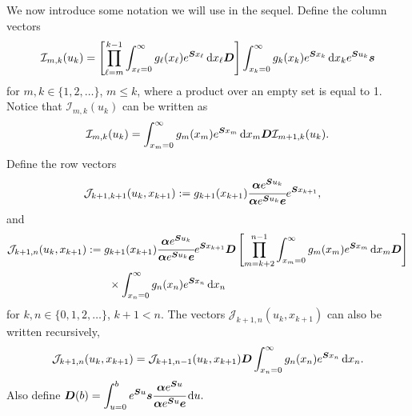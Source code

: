 We now introduce some notation we will use in the sequel. Define the column vectors 
\begin{align}
	\mathcal I_{m,k}(u_k) = \left[\prod_{\ell=m}^{k-1}\int_{x_\ell=0}^\infty g_\ell(x_\ell) e^{\boldsymbol{S}x_\ell}\, \mathrm{d} x_\ell \boldsymbol{D} \right]
            	\int_{x_k=0}^\infty g_{k}(x_k) e^{\boldsymbol{S}x_k} \, \mathrm{d} x_k e^{\boldsymbol{S}u_k}\boldsymbol s
\end{align}
for \(m,k\in\{1,2,\dots\}\), \(m\leq k\), where a product over an empty set is equal to 1. Notice that \(\mathcal I_{m,k}(u_k)\) can be written as 
\begin{align}
	\mathcal I_{m,k}(u_k) = \int_{x_m=0}^\infty g_m(x_m)e^{\boldsymbol Sx_m} \, \mathrm{d} x_m \boldsymbol D \mathcal I_{m+1,k}(u_k). \label{eqn: I recursive} 
\end{align}
Define the row vectors 
\begin{align}
	\mathcal J_{k+1,k+1}(u_k,x_{k+1}) &:= g_{k+1}(x_{k+1})\cfrac{\boldsymbol \alpha e^{\boldsymbol{S}u_{k}}}{\boldsymbol \alpha e^{\boldsymbol{S}u_{k}}\boldsymbol e}e^{\boldsymbol{S}x_{k+1}},
\end{align}
and
\begin{align}
	\mathcal J_{k+1,n}(u_k,x_{k+1}) &:= g_{k+1}(x_{k+1})\cfrac{\boldsymbol \alpha e^{\boldsymbol{S}u_{k}}}{\boldsymbol \alpha e^{\boldsymbol{S}u_{k}}\boldsymbol e} e^{\boldsymbol{S}x_{k+1}} \boldsymbol{D} \left[\prod_{m=k+2}^{n-1}\int_{x_{m}=0}^\infty g_{m}(x_{m}) e^{\boldsymbol{S}x_{m}} \, \mathrm{d} x_{m} \boldsymbol{D} \right]\nonumber
            	\\&\qquad\times\int_{x_n=0}^\infty g_{n}(x_n) e^{\boldsymbol{S}x_n} \, \mathrm{d} x_n
\end{align}
for \(k,n\in\{0,1,2,\dots\}\), \(k+1<n\). The vectors \(\mathcal J_{k+1,n}(u_k,x_{k+1})\) can also be written recursively, 
\begin{align}
	\mathcal J_{k+1,n}(u_k,x_{k+1}) = \mathcal J_{k+1,n-1}(u_k,x_{k+1})\boldsymbol D \int_{x_n=0}^\infty g_n(x_n)e^{\boldsymbol Sx_n}\, \mathrm{d} x_n.\label{eqn: J recursive} 
\end{align}
Also define \(\displaystyle\boldsymbol D(b) = \int_{u=0}^be^{\boldsymbol Su}\boldsymbol s \cfrac{\boldsymbol\alpha e^{\boldsymbol S u}}{\boldsymbol \alpha e^{\boldsymbol S u}\boldsymbol e} \, \mathrm{d} u.\)

